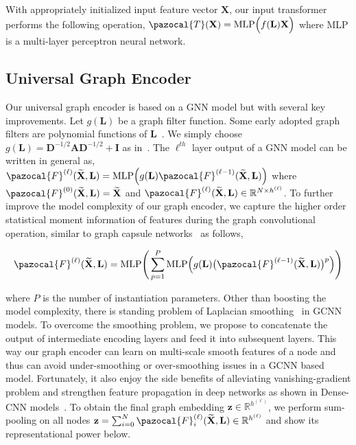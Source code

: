 \documentclass{article}
\newcommand{\Ta}{\pazocal{T}}
\newcommand{\Fa}{\pazocal{F}}
\begin{document}
With  	   appropriately initialized  input feature vector $\mathbf{X}$,  our input  transformer performs the following  operation, $\Ta(\mathbf{X})  = \text{MLP}\Big( f(\mathbf{L})\mathbf{X}\Big)$
where MLP is a multi-layer perceptron  neural network.
\vspace{-0.8em}
\subsection{Universal Graph  Encoder}
\vspace{-0.7em}
Our universal graph encoder is based on a GNN model but with several key improvements. Let $g(\mathbf{L})$ be a graph filter function. Some early adopted graph filters are  polynomial functions of $\mathbf{L}$~\cite{defferrard2016convolutional}. We simply choose $g(\mathbf{L}) = \mathbf{D}^{-1/2}\mathbf{A}\mathbf{D}^{-1/2} + \mathbf{I}$ as  in~\cite{kipf2016semi}. The  $\ell^{th}$ layer output of a GNN model  can be written in general as, $\Fa^{(\ell)}(\mathbf{\widetilde{X}}, \mathbf{L})   = \text{MLP}  \Big( g(\mathbf{L})\Fa^{(\ell-1)}(\mathbf{\widetilde{X}}, \mathbf{L}) \Big)$ where $\Fa^{(0)}(\mathbf{\widetilde{X}}, \mathbf{L}) =\mathbf{\widetilde{X}}$ and $\Fa^{(\ell)}(\mathbf{\widetilde{X}}, \mathbf{L}) \in \mathbb{R}^{N \times h^{(\ell)}}$. To further improve the model complexity of our graph encoder, we  capture  the  higher order  statistical  moment information of features during the graph convolutional operation, similar to graph capsule networks~\cite{verma2018graph} as follows,   






\vspace{-2em}
\begin{equation}\label{eq:capsule}
\begin{split}
\Fa^{(\ell)}(\mathbf{\widetilde{X}}, \mathbf{L})  &  = \text{MLP}\Bigg(   \sum_{p=1}^{P} \text{MLP}\Big(  g(\mathbf{L})\big(\Fa^{(\ell-1)}(\mathbf{\widetilde{X}}, \mathbf{L}) \big)^{p}\Big)  \Bigg)\\
\end{split}
\end{equation}
\vspace{-2em}

where   $P$ is the number of instantiation parameters. Other than boosting the model complexity,  there is standing problem of Laplacian smoothing~\cite{li2018deeper} in GCNN models. To overcome the smoothing problem, we propose to concatenate the output of intermediate   encoding layers and feed it into subsequent layers. This way our graph encoder can learn on multi-scale smooth features of a node and thus can avoid under-smoothing or over-smoothing issues in a GCNN based model. Fortunately, it also enjoy the side benefits of   alleviating   vanishing-gradient problem and strengthen feature propagation in deep networks as shown in  Dense-CNN models~\cite{huang2017densely}. To obtain  the final graph embedding $\mathbf{z}\in \mathbb{R}^{h^{(\ell)}}$, we perform   sum-pooling on all nodes $\mathbf{z} = \sum_{i=0}^{N} \Fa_{i}^{(\ell)}(\mathbf{\widetilde{X}}, \mathbf{L}) \in \mathbb{R}^{h^{(\ell)}}$ and show its representational power below. 
\end{document}
